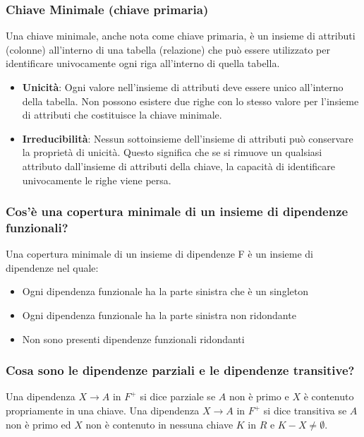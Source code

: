\documentclass{article}
\begin{document}
\subsubsection{Chiave Minimale (chiave primaria)}
Una chiave minimale, anche nota come chiave primaria, è un insieme di attributi (colonne) all'interno di una tabella (relazione) che può essere utilizzato per identificare univocamente ogni riga all'interno di quella tabella.
\begin{itemize}
  \item \textbf{Unicità}: Ogni valore nell'insieme di attributi deve essere unico all'interno della tabella. Non possono esistere due righe con lo stesso valore per l'insieme di attributi che costituisce la chiave minimale.
  \item \textbf{Irreducibilità}: Nessun sottoinsieme dell'insieme di attributi può conservare la proprietà di unicità. Questo significa che se si rimuove un qualsiasi attributo dall'insieme di attributi della chiave, la capacità di identificare univocamente le righe viene persa.
\end{itemize}

\subsubsection{Cos'è una copertura minimale di un insieme di dipendenze funzionali?}
Una copertura minimale di un insieme di dipendenze F è un insieme di dipendenze nel quale:
\begin{itemize}
  \item Ogni dipendenza funzionale ha la parte sinistra che è un singleton
  \item Ogni dipendenza funzionale ha la parte sinistra non ridondante
  \item Non sono presenti dipendenze funzionali ridondanti
\end{itemize}



\subsubsection{Cosa sono le dipendenze parziali e le dipendenze transitive?}
Una dipendenza $X \rightarrow A$ in $F^+$ si dice parziale se $A$ non è primo e $X$ è contenuto propriamente in una chiave. Una dipendenza $X \rightarrow A$ in $F^+$ si dice transitiva se $A$ non è primo ed $X$ non è contenuto in nessuna chiave $K$ in $R$ e $K - X \neq \emptyset$.\\
\end{document}
